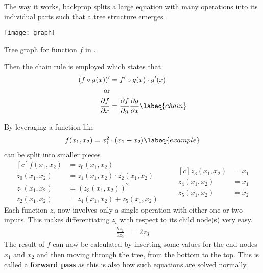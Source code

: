 The way it works, backprop splits a large equation with many operations into its individual parts such that a tree structure emerges.
\begin{marginfigure}
    \texttt{[image: graph]}
    \caption{Tree graph for function $f$ in .}
\end{marginfigure}
Then the chain rule is employed which states that
\begin{align}
    (f \circ g (x))' & = f' \circ g(x) \cdot g'(x) \\
    \text{or} \nonumber\\
    \frac{\partial f}{\partial x} & = \frac{\partial f}{\partial g} \frac{\partial g}{\partial x}
    \labeq{chain}
\end{align}

By leveraging  a function like 
\begin{align}
    f(x_1, x_2) = x_1^2 \cdot (x_1 + x_2)
    \labeq{example}
\end{align}
can be split into smaller pieces
\begin{equation*}
\begin{aligned}[c]
    f(x_1, x_2) & = z_0(x_1, x_2) \\
    z_0(x_1, x_2) & = z_1(x_1, x_2) \cdot z_2(x_1, x_2) \\
    z_1(x_1, x_2) & = (z_3(x_1, x_2))^2 \\
    z_2(x_1, x_2) & = z_4(x_1, x_2) + z_5(x_1, x_2)
\end{aligned}
\qquad
\begin{aligned}[c]
    z_3(x_1, x_2) & = x_1 \\
    z_4(x_1, x_2) & = x_1 \\
    z_5(x_1, x_2) & = x_2
\end{aligned}
\end{equation*}
Each function $z_i$ now involves only a single operation with either one or two inputs.
This makes differentiating $z_i$ with respect to its child node(s) very easy.
\eg
\begin{align}
    \frac{\partial z_1}{\partial z_3} & = 2 z_3
\end{align}
The result of $f$ can now be calculated by inserting some values for the end nodes $x_1$ and $x_2$ and then moving through the tree, from the bottom to the top.
This is called a \textbf{forward pass} as this is also how such equations are solved normally.
